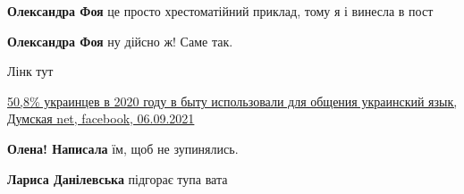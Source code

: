 \begin{itemize}
\begin{itemize}
 
\textbf{Олександра Фоя} це просто хрестоматійний приклад, тому я і винесла в пост

 
\textbf{Олександра Фоя} ну дійсно ж! Саме так.
\end{itemize}

 
Лінк тут

\href{https://www.facebook.com/205838236106547/posts/4827999290557062/}{%
50,8\% украинцев в 2020 году в быту использовали для общения украинский язык, %
Думская net, facebook, 06.09.2021%
}

\begin{itemize}
 
\textbf{Олена! Написала} їм, щоб не зупинялись.

 
\textbf{Лариса Данілевська} підгорає тупа вата

 

\end{itemize}
\end{itemize}
